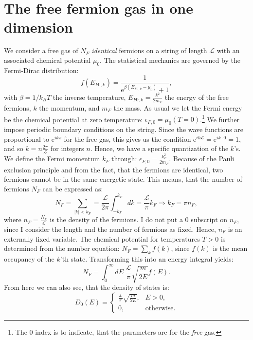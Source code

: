 \section{The free fermion gas in one dimension} \label{sec.chemicalpotential.freegas}
We consider a free gas of $N_F$ \textit{identical} fermions on a string of length $\mathcal{L}$ with an associated chemical potential $\mu_0$. The statistical mechanics are governed by the Fermi-Dirac distribution:
\begin{equation}
f(E_{F0,k}) = \frac{1}{\text{e}^{\beta(E_{F0,k}-\mu_0)} + 1},
\end{equation}
with $\beta = 1/k_BT$ the inverse temperature, $E_{F0,k} = \frac{k^2}{2m_F}$ the energy of the free fermions, $k$ the momentum, and $m_F$ the mass. As usual we let the Fermi energy be the chemical potential at zero temperature: $\epsilon_{F,0} = \mu_0(T=0)$.\footnote{The 0 index is to indicate, that the parameters are for the \textit{free} gas.} We further impose periodic boundary conditions on the string. Since the wave functions are proportional to $\text{e}^{ikx}$ for the free gas, this gives us the condition $\text{e}^{ik\mathcal{L}} = \text{e}^{ik\cdot 0} = 1$, and so $k = n\frac{2\pi}{\mathcal{L}}$ for integers $n$. Hence, we have a specific quantization of the $k$'s. We define the Fermi momentum $k_F$ through: $\epsilon_{F,0} = \frac{k_F^2}{2m_F}$. Because of the Pauli exclusion principle and from the fact, that the fermions are identical, two fermions cannot be in the same energetic state. This means, that the number of fermions $N_F$ can be expressed as:
\begin{equation}
N_F = \sum_{|k|< k_F} = \frac{\mathcal{L}}{2\pi} \int_{-k_F}^{k_F} dk = \frac{\mathcal{L}}{\pi} k_F \Rightarrow k_F = \pi n_F, 
\label{eq.relationkfnf}
\end{equation}
where $n_F = \frac{N_F}{\mathcal{L}}$ is the density of the fermions. I do not put a 0 subscript on $n_F$, since I consider the length and the number of fermions as fixed. Hence, $n_F$ is an externally fixed variable. The chemical potential for temperatures $T>0$ is determined from the number equation: $N_F = \sum_k f(k)$, since $f(k)$ is the mean occupancy of the $k$'th state. Transforming this into an energy integral yields:
\begin{equation}
N_F = \int_0^\infty dE \; \frac{\mathcal{L}}{\pi}\sqrt{\frac{m}{2E}} f(E). 
\label{eq.numberequationfreegas}
\end{equation}
From here we can also see, that the density of states is:
\begin{equation}
D_0(E) = \left\{\begin{matrix}
 \frac{\mathcal{L}}{\pi}\sqrt{\frac{m}{2E}}, & E > 0,  \\ 
 0, & \text{otherwise}. 
\end{matrix}\right. 
\label{eq.densityofstatesfreegas}
\end{equation}
